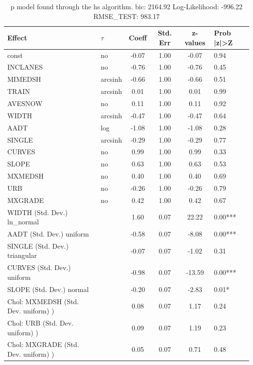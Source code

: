 \begin{table}
	\caption{p model found through the hs algorithm. bic: 2164.92 Log-Likelihood: -996.22 RMSE_TEST: 983.17}
	\begin{center}
		\begin{tabular}{|l|l|c|c|c|l|}
			\hline
			Effect & $\tau$ & Coeff & Std. Err & z-values & Prob |z|>Z \\
			\hline
			const & no & -0.07 & 1.00 & -0.07 & 0.94 \\
			\hline
			INCLANES & no & -0.76 & 1.00 & -0.76 & 0.45 \\
			\hline
			MIMEDSH & arcsinh & -0.66 & 1.00 & -0.66 & 0.51 \\
			\hline
			TRAIN & arcsinh & 0.01 & 1.00 & 0.01 & 0.99 \\
			\hline
			AVESNOW & no & 0.11 & 1.00 & 0.11 & 0.92 \\
			\hline
			WIDTH & arcsinh & -0.47 & 1.00 & -0.47 & 0.64 \\
			\hline
			AADT & log & -1.08 & 1.00 & -1.08 & 0.28 \\
			\hline
			SINGLE & arcsinh & -0.29 & 1.00 & -0.29 & 0.77 \\
			\hline
			CURVES & no & 0.99 & 1.00 & 0.99 & 0.33 \\
			\hline
			SLOPE & no & 0.63 & 1.00 & 0.63 & 0.53 \\
			\hline
			MXMEDSH & no & 0.40 & 1.00 & 0.40 & 0.69 \\
			\hline
			URB & no & -0.26 & 1.00 & -0.26 & 0.79 \\
			\hline
			MXGRADE & no & 0.42 & 1.00 & 0.42 & 0.67 \\
			\hline
			WIDTH (Std. Dev.) ln_normal &  & 1.60 & 0.07 & 22.22 & 0.00*** \\
			\hline
			AADT (Std. Dev.) uniform &  & -0.58 & 0.07 & -8.08 & 0.00*** \\
			\hline
			SINGLE (Std. Dev.) triangular &  & -0.07 & 0.07 & -1.02 & 0.31 \\
			\hline
			CURVES (Std. Dev.) uniform &  & -0.98 & 0.07 & -13.59 & 0.00*** \\
			\hline
			SLOPE (Std. Dev.) normal &  & -0.20 & 0.07 & -2.83 & 0.01* \\
			\hline
			 Chol: MXMEDSH (Std. Dev. uniform) ) &  & 0.08 & 0.07 & 1.17 & 0.24 \\
			\hline
			 Chol: URB (Std. Dev. uniform) ) &  & 0.09 & 0.07 & 1.19 & 0.23 \\
			\hline
			 Chol: MXGRADE (Std. Dev. uniform) ) &  & 0.05 & 0.07 & 0.71 & 0.48 \\

\end{tabular}
\end{center}
\end{table}

